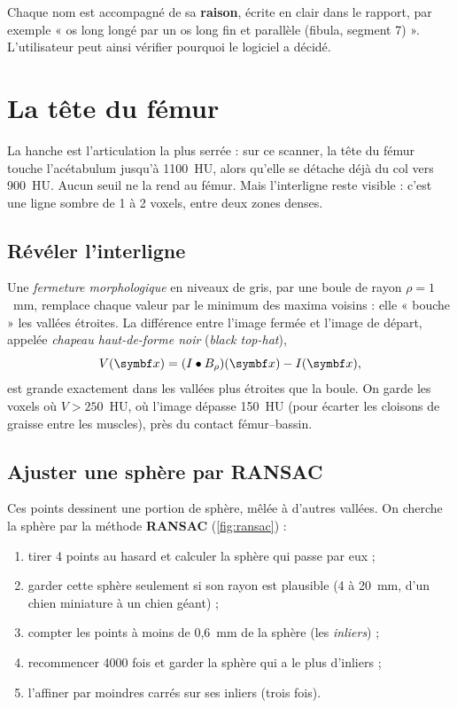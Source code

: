Chaque nom est accompagné de sa \textbf{raison}, écrite en clair dans le rapport, par exemple « os long longé par un os
long fin et parallèle (fibula, segment 7) ». L'utilisateur peut ainsi vérifier pourquoi le logiciel a décidé.

\section{La tête du fémur}
\label{sec:tete}

La hanche est l'articulation la plus serrée : sur ce scanner, la tête du fémur touche l'acétabulum jusqu'à 1100~HU,
alors qu'elle se détache déjà du col vers 900~HU. Aucun seuil ne la rend au fémur. Mais l'interligne reste visible :
c'est une ligne sombre de 1 à 2 voxels, entre deux zones denses.

\subsection{Révéler l'interligne}

Une \emph{fermeture morphologique} en niveaux de gris, par une boule de rayon $\rho = 1$~mm, remplace chaque valeur par
le minimum des maxima voisins : elle « bouche » les vallées étroites. La différence entre l'image fermée et l'image
de départ, appelée \emph{chapeau haut-de-forme noir} (\emph{black top-hat}),
\begin{equation}
  V(\vb{x}) = (I \bullet B_\rho)(\vb{x}) - I(\vb{x}),
\end{equation}
est grande exactement dans les vallées plus étroites que la boule. On garde les voxels où $V > 250$~HU, où l'image
dépasse 150~HU (pour écarter les cloisons de graisse entre les muscles), près du contact fémur--bassin.

\subsection{Ajuster une sphère par RANSAC}

Ces points dessinent une portion de sphère, mêlée à d'autres vallées. On cherche la sphère par la méthode
\textbf{RANSAC} \cite{fischler1981} (\cref{fig:ransac}) :
\begin{enumerate}
  \item tirer 4 points au hasard et calculer la sphère qui passe par eux ;
  \item garder cette sphère seulement si son rayon est plausible (4 à 20~mm, d'un chien miniature à un chien géant) ;
  \item compter les points à moins de 0,6~mm de la sphère (les \emph{inliers}) ;
  \item recommencer 4000 fois et garder la sphère qui a le plus d'inliers ;
  \item l'affiner par moindres carrés sur ses inliers (trois fois).
\end{enumerate}

